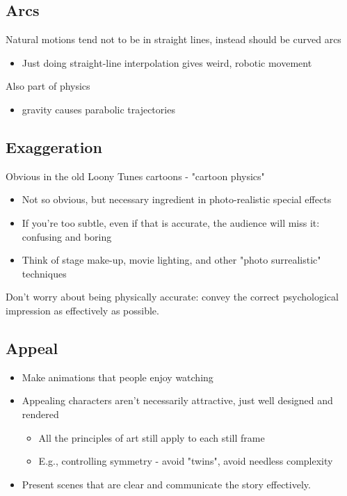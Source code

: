 \documentclass{article}
\begin{document}
\subsection*{Arcs}
Natural motions tend not to be in straight lines, instead should be curved arcs
\begin{itemize}
    \item Just doing straight-line interpolation gives weird, robotic movement
\end{itemize}
Also part of physics
\begin{itemize}
    \item gravity causes parabolic trajectories
\end{itemize}

\subsection*{Exaggeration}
Obvious in the old Loony Tunes cartoons - "cartoon physics"
\begin{itemize}
    \item Not so obvious, but necessary ingredient in photo-realistic special effects
    \item If you're too subtle, even if that is accurate, the audience will miss it: confusing and boring
    \item Think of stage make-up, movie lighting, and other "photo surrealistic" techniques
\end{itemize}
Don't worry about being physically accurate: convey the correct psychological impression as effectively as possible.

\subsection*{Appeal}
\begin{itemize}
    \item Make animations that people enjoy watching
    \item Appealing characters aren't necessarily attractive, just well designed and rendered
    \begin{itemize}
        \item All the principles of art still apply to each still frame
        \item E.g., controlling symmetry - avoid "twins", avoid needless complexity
    \end{itemize}
    \item Present scenes that are clear and communicate the story effectively.
\end{itemize}
\end{document}
